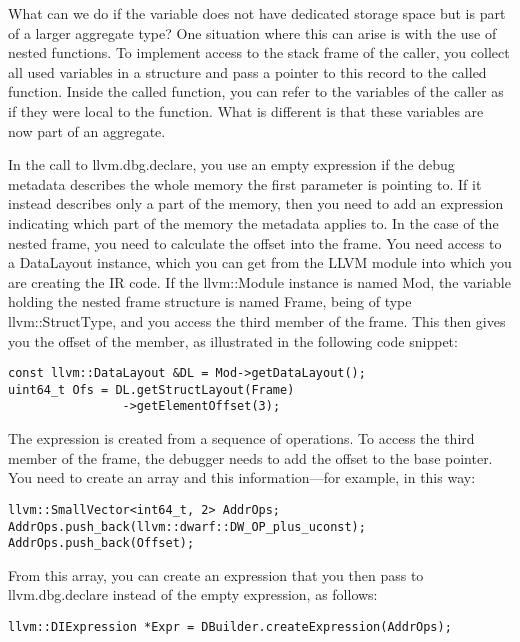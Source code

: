 What can we do if the variable does not have dedicated storage space but is part of a larger aggregate type? One situation where this can arise is with the use of nested functions. To implement access to the stack frame of the caller, you collect all used variables in a structure and pass a pointer to this record to the called function. Inside the called function, you can refer to the variables of the caller as if they were local to the function. What is different is that these variables are now part of an aggregate.\par

In the call to llvm.dbg.declare, you use an empty expression if the debug metadata describes the whole memory the first parameter is pointing to. If it instead describes only a part of the memory, then you need to add an expression indicating which part of the memory the metadata applies to. In the case of the nested frame, you need to calculate the offset into the frame. You need access to a DataLayout instance, which you can get from the LLVM module into which you are creating the IR code. If the llvm::Module instance is named Mod, the variable holding the nested frame structure is named Frame, being of type llvm::StructType, and you access the third member of the frame. This then gives you the offset of the member, as illustrated in the following code snippet:\par

\begin{lstlisting}[caption={}]
const llvm::DataLayout &DL = Mod->getDataLayout();
uint64_t Ofs = DL.getStructLayout(Frame)
				->getElementOffset(3);
\end{lstlisting}

The expression is created from a sequence of operations. To access the third member of 
the frame, the debugger needs to add the offset to the base pointer. You need to create an 
array and this information—for example, in this way:

\begin{lstlisting}[caption={}]
llvm::SmallVector<int64_t, 2> AddrOps;
AddrOps.push_back(llvm::dwarf::DW_OP_plus_uconst);
AddrOps.push_back(Offset);
\end{lstlisting}

From this array, you can create an expression that you then pass to llvm.dbg.declare instead of the empty expression, as follows:\par

\begin{lstlisting}[caption={}]
llvm::DIExpression *Expr = DBuilder.createExpression(AddrOps);
\end{lstlisting}

